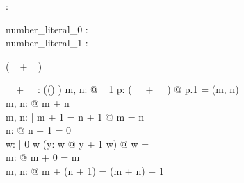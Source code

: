 \begin{axdef}
\nat : \power \arithmos
\end{axdef}

\begin{axdef}
  number\_literal\_0 : \nat\\
  number\_literal\_1 : \nat
\end{axdef}

\begin{zed}
 \leftassoc (\_ + \_)
\end{zed}

\begin{axdef}
\_ + \_ : \power ((\arithmos \cross \arithmos) \cross \arithmos)
\where
\forall m, n: \nat @ \exists_1 p: ( \_ + \_ ) @ p.1 = (m, n)\\
\forall m, n: \nat @ m + n \in \nat\\
\forall m, n: \nat | m + 1 = n + 1 @ m = n\\
\forall n: \nat @ \lnot n + 1 = 0\\
\forall w: \power \nat | 0 \in w \land (\forall y: w @ y + 1 \in w) @ w = \nat\\
\forall m: \nat @ m + 0 = m\\
\forall m, n: \nat @ m + (n + 1) = (m + n) + 1
\end{axdef}

